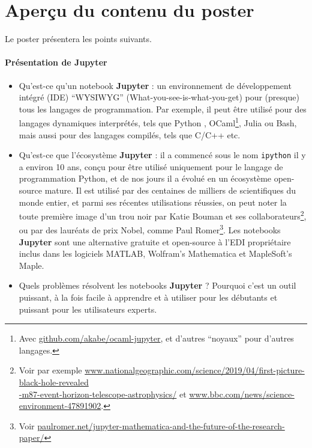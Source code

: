 \documentclass[runningheads]{llncs}
\newcommand{\Jupyter}{\textbf{Jupyter}}
\begin{document}
\section*{Aperçu du contenu du poster}

Le poster présentera les points suivants.

\paragraph{Présentation de \Jupyter}


\begin{itemize}
    \item Qu'est-ce qu'un notebook \Jupyter{} : un environnement de développement intégré (IDE) ``WYSIWYG'' (What-you-see-is-what-you-get) pour (presque) tous les langages de programmation. Par exemple, il peut être utilisé pour des langages dynamiques interprétés, tels que Python \cite{python}, OCaml\footnote{Avec \url{github.com/akabe/ocaml-jupyter}, et d'autres ``noyaux'' pour d'autres langages.}, Julia ou Bash, mais aussi pour des langages compilés, tels que C/C++ etc.

    \item Qu'est-ce que l'écosystème \Jupyter{} : il a commencé sous le nom \texttt{ipython} \cite{ipython} il y a environ 10 ans, conçu pour être utilisé uniquement pour le langage de programmation Python, et de nos jours il a évolué en un écosystème open-source mature.
    Il est utilisé par des centaines de milliers de scientifiques du monde entier, et parmi ses récentes utilisations réussies, on peut noter la toute première image d'un trou noir par Katie Bouman et ses collaborateurs\footnote{Voir par exemple \url{www.nationalgeographic.com/science/2019/04/first-picture-black-hole-revealed}\\\url{-m87-event-horizon-telescope-astrophysics/} et \url{www.bbc.com/news/science-environment-47891902}.}, ou par des lauréats de prix Nobel, comme Paul Romer\footnote{Voir \url{paulromer.net/jupyter-mathematica-and-the-future-of-the-research-paper/}}.
    Les notebooks \Jupyter{} sont une alternative gratuite et open-source à l'EDI propriétaire inclus dans les logiciels MATLAB, Wolfram's Mathematica et MapleSoft's Maple.

    \item Quels problèmes résolvent les notebooks \Jupyter{} ? Pourquoi c'est un outil puissant, à la fois facile à apprendre et à utiliser pour les débutants et puissant pour les utilisateurs experts.
\end{itemize}
\end{document}

